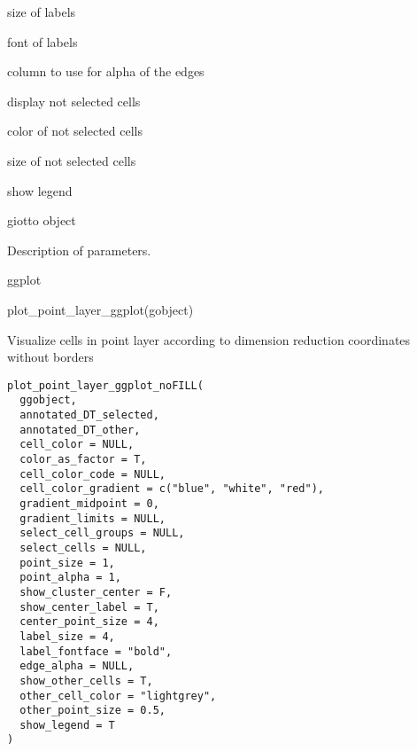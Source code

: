 \documentclass[a4paper]{book}
\begin{document}
\begin{Arguments}
\begin{ldescription}
\item[\code{label\_size}] size of labels

\item[\code{label\_fontface}] font of labels

\item[\code{edge\_alpha}] column to use for alpha of the edges

\item[\code{show\_other\_cells}] display not selected cells

\item[\code{other\_cell\_color}] color of not selected cells

\item[\code{other\_point\_size}] size of not selected cells

\item[\code{show\_legend}] show legend

\item[\code{gobject}] giotto object
\end{ldescription}
\end{Arguments}
%
\begin{Details}\relax
Description of parameters.
\end{Details}
%
\begin{Value}
ggplot
\end{Value}
%
\begin{Examples}
\begin{ExampleCode}
    plot_point_layer_ggplot(gobject)
\end{ExampleCode}
\end{Examples}
%
\begin{Description}\relax
Visualize cells in point layer according to dimension reduction coordinates without borders
\end{Description}
%
\begin{Usage}
\begin{verbatim}
plot_point_layer_ggplot_noFILL(
  ggobject,
  annotated_DT_selected,
  annotated_DT_other,
  cell_color = NULL,
  color_as_factor = T,
  cell_color_code = NULL,
  cell_color_gradient = c("blue", "white", "red"),
  gradient_midpoint = 0,
  gradient_limits = NULL,
  select_cell_groups = NULL,
  select_cells = NULL,
  point_size = 1,
  point_alpha = 1,
  show_cluster_center = F,
  show_center_label = T,
  center_point_size = 4,
  label_size = 4,
  label_fontface = "bold",
  edge_alpha = NULL,
  show_other_cells = T,
  other_cell_color = "lightgrey",
  other_point_size = 0.5,
  show_legend = T
)
\end{verbatim}
\end{Usage}
\end{document}
